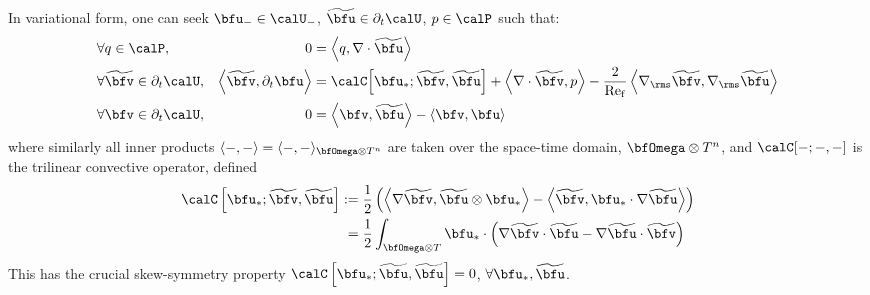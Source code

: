     \shortline
    
    In variational form, one can seek $\bfu_{-} \in \calU_{-}$, $\widetilde{\bfu} \in \partial_{t}\calU$, $p \in \calP$ such that:
    \begin{align}
        &\forall                 q  \in  \calP,              &                                                            0  &=  \left\langle q, \nabla\cdot\widetilde{\bfu}\right\rangle  \\
        &\forall  \widetilde{\bfv}  \in  \partial_{t}\calU,  &  \left\langle\widetilde{\bfv}, \partial_{t}\bfu\right\rangle  &=  \calC\!\left[\bfu_{*}; \widetilde{\bfv}, \widetilde{\bfu}\right] + \left\langle\nabla\cdot\widetilde{\bfv}, p\right\rangle - \frac{2}{\rmRef}\left\langle\nabla_{\rms}\widetilde{\bfv}, \nabla_{\rms}\widetilde{\bfu}\right\rangle  \\
        &\forall              \bfv  \in  \partial_{t}\calU,  &                                                            0  &=  \left\langle\bfv, \widetilde{\bfu}\right\rangle - \left\langle\bfv, \bfu\right\rangle
    \end{align}
    where similarly all inner products $\langle -, -\rangle  =  \langle -, -\rangle_{\bfOmega\otimes T^{n}}$ are taken over the space-time domain, $\bfOmega\otimes T^{n}$, and $\calC[-; -, -]$ is the trilinear convective operator, defined
    \begin{align}
        \calC\left[\bfu_{*}; \widetilde{\bfv}, \widetilde{\bfu}\right]  :=  &\;\frac{1}{2}\left(\left\langle\nabla\widetilde{\bfv}, \widetilde{\bfu}\otimes\bfu_{*}\right\rangle - \left\langle\widetilde{\bfv}, \bfu_{*}\cdot\nabla\widetilde{\bfu}\right\rangle\right)  \label{eqn:convective operator definition}  \\
                                                                         =  &\;\frac{1}{2}\int_{\bfOmega\otimes T}\bfu_{*}\cdot\left(\nabla\widetilde{\bfv}\cdot\widetilde{\bfu} - \nabla\widetilde{\bfu}\cdot\widetilde{\bfv}\right)
    \end{align}
    This has the crucial skew-symmetry property $\calC\left[\bfu_{*}; \widetilde{\bfu}, \widetilde{\bfu}\right]  =  0$, $\forall \bfu_{*}, \widetilde{\bfu}$.

    \line

